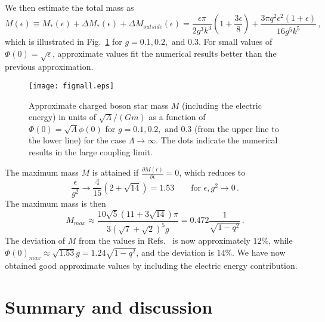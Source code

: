\documentclass[
aps,prd,
12pt,%
nopreprintnumbers,
showpacs,
eqsecnum,
nofootinbib
]{revtex4-1}
\begin{document}
We then estimate the total mass as
\begin{equation}
M(\epsilon)\equiv M_*(\epsilon)+\Delta M_*(\epsilon)+\Delta
M_{outside}(\epsilon)=\frac{\epsilon\pi}{2g^3k^3}\left(1+\frac{3\epsilon}{8}
\right)+\frac{3\pi q^2\epsilon^2 (1+\epsilon)}{16g^5k^5}\,,
\end{equation}
which is illustrated in Fig.~\ref{figmall} for $g=0.1,0.2,\mbox{~and~} 0.3$.
For small values of $\Phi(0)=\sqrt{\epsilon}$, approximate values fit
the numerical results  better than the previous approximation. 


\begin{figure}[ht]
\centering
\texttt{[image: figmall.eps]}
\caption{
Approximate charged boson star mass $M$ (including the electric energy) in
units of
$\sqrt{\Lambda}/(Gm)$ as a function of
$\Phi(0)=\sqrt{\Lambda}\phi(0)$ for $g=0.1, 0.2,\mbox{~and~} 0.3$ (from the upper
line to the lower line) for the case $\Lambda\rightarrow\infty$. The dots indicate
the numerical results in the large coupling limit.}
\label{figmall}
\end{figure}

The maximum mass $M$ is attained if $\frac{\partial
M(\epsilon)}{\partial\epsilon}=0$, which reduces to
\begin{equation}
\frac{\epsilon}{g^2}\rightarrow\frac{4}{15}(2+\sqrt{14})=1.53
\qquad \mbox{for } \epsilon, g^2\rightarrow 0\,.
\end{equation}
The maximum mass is then
\begin{equation}
M_{max}\approx\frac{10\sqrt{5}(11+3\sqrt{14})\pi}{3(\sqrt{7}+\sqrt{2})^{5}g}
=0.472\frac{1}{\sqrt{1-q^2}}\,.
\end{equation}
The deviation of $M$ from the values in Refs.~\cite{Jetzer,JB} is now approximately
$12\%$, while $\Phi(0)_{max}\approx\sqrt{1.53}g=1.24\sqrt{1-q^2}$, and the
deviation is
$14\%$. We have now obtained good approximate values by including the electric
energy contribution.



\section{Summary and discussion}
\label{so}
\end{document}
